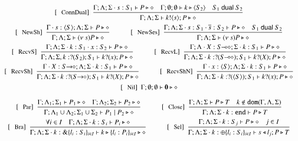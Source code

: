 \begin{figure}[!t]
\[\begin{array}{c}
		\trule{ConnDual}~~\tree{
			\Gamma; \Lambda; \Sigma \cat s: S_1 \proves P \hastype \Proc  \quad \Gamma; \emptyset; \emptyset \proves k \hastype \chtype{S_2} \quad S_1 \dualof S_2
		}{
			\Gamma; \Lambda; \Sigma  \proves \bout{k}{s} P \hastype \Proc
		}

		\\[4mm]

		\trule{NewSh}~~\tree{
			\Gamma\cat s:\chtype{S} ; \Lambda; \Sigma \proves P \hastype \Proc
		}{
			\Gamma; \Lambda; \Sigma \proves \news{s} P \hastype \Proc}
		\qquad\quad
		\trule{NewSes}~~\tree{
			\Gamma; \Lambda; \Sigma \cat s:S_1 \cat \dual{s}: S_2 \proves P \hastype \Proc \quad S_1 \dualof S_2
		}{
			\Gamma; \Lambda; \Sigma \proves \news{s} P \hastype \Proc
		}
		\\[4mm]

		\trule{RecvS}~~\tree{
			\Gamma; \Lambda; \Sigma \cat k: S_1 \cat x: S_2 \proves P \hastype \Proc
		}{
			\Gamma; \Lambda; \Sigma, k: \btinp{S_2} S_1  \vdash \binp{k}{x}P \hastype \Proc
		}
		\qquad\quad 
		\trule{RecvL}~~\tree{
			\Gamma; \Lambda \cat X: \lhot{S}; \Sigma \cat k: S_1  \proves P \hastype \Proc
		}{
			\Gamma; \Lambda; \Sigma \cat k:\btinp{\lhot{S}}S_1  \proves \binp{k}{X}P \hastype \Proc
		}
		\\[4mm]

		\trule{RecvSh}~~\tree{
			\Gamma \cat X: \shot{S}; \Lambda; \Sigma \cat k: S_1  \proves P \hastype \Proc
		}{
			\Gamma; \Lambda; \Sigma \cat k:\btinp{\shot{S}}S_1  \proves \binp{k}{X}P \hastype \Proc
		}
		\qquad \quad
		\trule{RecvShN}~~\tree{
			\Gamma \cat x: \chtype{S}; \Lambda; \Sigma \cat k: S_1  \proves P \hastype \Proc
		}{
			\Gamma; \Lambda; \Sigma \cat k:\btinp{\chtype{S}}S_1  \proves \binp{k}{x}P \hastype \Proc
		}
		\\[4mm]

		\trule{Nil}~~\Gamma; \emptyset; \emptyset \proves \inact \hastype \Proc
		\\[4mm]

		\trule{Par}~~\tree{
			\Gamma; \Lambda_{1}; \Sigma_{1} \proves P_{1} \hastype \Proc \quad \Gamma; \Lambda_{2}; \Sigma_{2} \proves P_{2} \hastype \Proc
		}{
			\Gamma; \Lambda_{1} \cup \Lambda_2; \Sigma_{1} \cup \Sigma_2 \proves P_1 \Par P_2 \hastype \Proc
		}
		\qquad\quad
		\trule{Close}~~\tree{
			\Gamma; \Lambda; \Sigma  \proves P \hastype T \quad k \not\in \dom{\Gamma, \Lambda,\Sigma}
		}{
			\Gamma; \Lambda; \Sigma \cat k: \tinact  \proves P \hastype T
		}
		\\[4mm]
		\trule{Bra}~~\tree{
			 \forall i \in I \quad \Gamma; \Lambda; \Sigma \cat k:S_i \proves P_i \hastype \Proc
		}{
			\Gamma; \Lambda; \Sigma \cat k: \btbra{l_i:S_i}_{i \in I} \proves \bbra{k}{l_i:P_i}_{i \in I}\hastype \Proc
		}
		\qquad\quad 
	 	\trule{Sel}~~\tree{
			\Gamma; \Lambda; \Sigma \cat k: S_j  \proves P \hastype \Proc \quad j \in I
		}{
			\Gamma; \Lambda; \Sigma \cat k:\btsel{l_i:S_i}_{i \in I} \proves \bsel{s}{l_j} P \hastype T
		}
		\\[4mm]


\end{array}\]
\end{figure}
